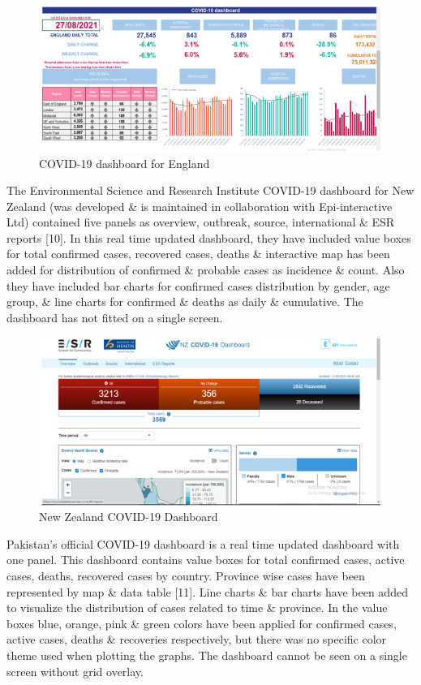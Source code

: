 \documentclass[
]{article}
\begin{document}
\begin{figure}
\includegraphics[width=8.46in]{Images/5} \caption{COVID-19 dashboard for England}\label{fig:unnamed-chunk-5}
\end{figure}

The Environmental Science and Research Institute COVID-19 dashboard for
New Zealand (was developed \& is maintained in collaboration with
Epi-interactive Ltd) contained five panels as overview, outbreak,
source, international \& ESR reports {[}10{]}. In this real time updated
dashboard, they have included value boxes for total confirmed cases,
recovered cases, deaths \& interactive map has been added for
distribution of confirmed \& probable cases as incidence \& count. Also
they have included bar charts for confirmed cases distribution by
gender, age group, \& line charts for confirmed \& deaths as daily \&
cumulative. The dashboard has not fitted on a single screen.

\begin{figure}
\includegraphics[width=8.47in]{Images/6} \caption{New Zealand COVID-19 Dashboard}\label{fig:unnamed-chunk-6}
\end{figure}

Pakistan's official COVID-19 dashboard is a real time updated dashboard
with one panel. This dashboard contains value boxes for total confirmed
cases, active cases, deaths, recovered cases by country. Province wise
cases have been represented by map \& data table {[}11{]}. Line charts
\& bar charts have been added to visualize the distribution of cases
related to time \& province. In the value boxes blue, orange, pink \&
green colors have been applied for confirmed cases, active cases, deaths
\& recoveries respectively, but there was no specific color theme used
when plotting the graphs. The dashboard cannot be seen on a single
screen without grid overlay.
\end{document}
